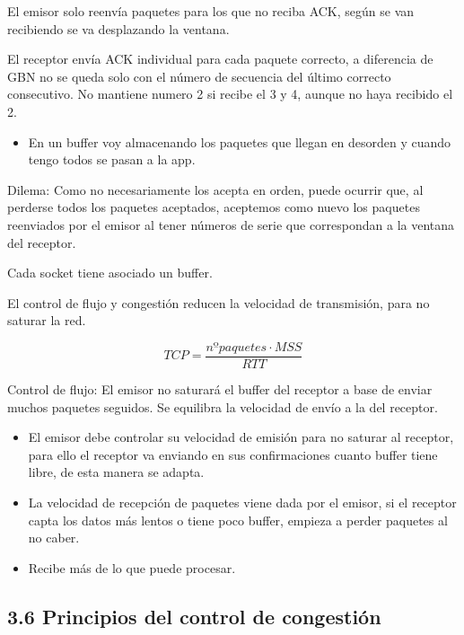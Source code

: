 \documentclass[12pt, twoside, openright]{report} %
\begin{document}
		El emisor solo reenvía paquetes para los que no reciba ACK,
        según se van recibiendo se va desplazando la ventana.

		El receptor envía ACK individual para cada paquete correcto, a
        diferencia de GBN no se queda solo con el número de secuencia
        del último correcto consecutivo. No mantiene numero 2 si recibe
        el 3 y 4, aunque no haya recibido el 2.

        \begin{itemize}
        \item
          En un buffer voy almacenando los paquetes que llegan en
          desorden y cuando tengo todos se pasan a la app.
        \end{itemize}

		Dilema: Como no necesariamente los acepta en orden, puede
        ocurrir que, al perderse todos los paquetes aceptados, aceptemos
        como nuevo los paquetes reenviados por el emisor al tener
        números de serie que correspondan a la ventana del receptor.


    Cada socket tiene asociado un buffer.

	El control de flujo y congestión reducen la velocidad de
    transmisión, para no saturar la red.

    $$TCP = \frac {nºpaquetes\cdot MSS}{RTT}$$

	Control de flujo: El emisor no saturará el buffer del receptor a
    base de enviar muchos paquetes seguidos. Se equilibra la velocidad
    de envío a la del receptor.

    \begin{itemize}
    \item
      El emisor debe controlar su velocidad de emisión para no saturar
      al receptor, para ello el receptor va enviando en sus
      confirmaciones cuanto buffer tiene libre, de esta manera se
      adapta.
    \item
      La velocidad de recepción de paquetes viene dada por el emisor, si
      el receptor capta los datos más lentos o tiene poco buffer, empieza
      a perder paquetes al no caber.
    \item
      Recibe más de lo que puede procesar.
    \end{itemize}
  
\pagebreak
\subsection{3.6 Principios del control de congestión}
\end{document}
